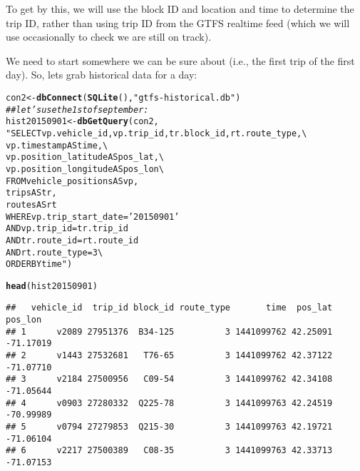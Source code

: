 \documentclass[10pt]{article}\usepackage[]{graphicx}\usepackage[]{color}
\makeatletter
\newcommand{\hlstr}[1]{\textcolor[rgb]{0.192,0.494,0.8}{#1}}%
\newcommand{\hlcom}[1]{\textcolor[rgb]{0.678,0.584,0.686}{\textit{#1}}}%
\newcommand{\hlstd}[1]{\textcolor[rgb]{0.345,0.345,0.345}{#1}}%
\newcommand{\hlkwb}[1]{\textcolor[rgb]{0.69,0.353,0.396}{#1}}%
\newcommand{\hlkwd}[1]{\textcolor[rgb]{0.737,0.353,0.396}{\textbf{#1}}}%
\newenvironment{kframe}{%
 \def\at@end@of@kframe{}%
 \ifinner\ifhmode%
  \def\at@end@of@kframe{\end{minipage}}%
  \begin{minipage}{\columnwidth}%
 \fi\fi%
 \def\FrameCommand##1{\hskip\@totalleftmargin \hskip-\fboxsep
 \colorbox{shadecolor}{##1}\hskip-\fboxsep
     \hskip-\linewidth \hskip-\@totalleftmargin \hskip\columnwidth}%
 \MakeFramed {\advance\hsize-\width
   \@totalleftmargin\z@ \linewidth\hsize
   \@setminipage}}%
 {\par\unskip\endMakeFramed%
 \at@end@of@kframe}
\newenvironment{knitrout}{}{} %
\makeatother
\begin{document}
To get by this, we will use the block ID and location and time to determine the trip ID,
rather than using trip ID from the GTFS realtime feed (which we will use occasionally to
check we are still on track).


We need to start somewhere we can be sure about (i.e., the first trip of the first day).
So, lets grab historical data for a day:
\begin{knitrout}
\color{fgcolor}\begin{kframe}
\begin{alltt}
\hlstd{con2} \hlkwb{<-} \hlkwd{dbConnect}\hlstd{(}\hlkwd{SQLite}\hlstd{(),} \hlstr{"gtfs-historical.db"}\hlstd{)}
\hlcom{## let's use the 1st of september:}
\hlstd{hist20150901} \hlkwb{<-} \hlkwd{dbGetQuery}\hlstd{(con2,}
                           \hlstr{"SELECT vp.vehicle_id, vp.trip_id, tr.block_id, rt.route_type, \textbackslash{}
                                   vp.timestamp AS time, \textbackslash{}
                                   vp.position_latitude AS pos_lat, \textbackslash{}
                                   vp.position_longitude AS pos_lon \textbackslash{}
                            FROM vehicle_positions AS vp, 
                                 trips             AS tr, 
                                 routes            AS rt
                            WHERE vp.trip_start_date = '20150901'
                              AND vp.trip_id    = tr.trip_id 
                              AND tr.route_id   = rt.route_id 
                              AND rt.route_type = 3 \textbackslash{}
                            ORDER BY time"}\hlstd{)}

\hlkwd{head}\hlstd{(hist20150901)}
\end{alltt}
\begin{verbatim}
##   vehicle_id  trip_id block_id route_type       time  pos_lat   pos_lon
## 1      v2089 27951376  B34-125          3 1441099762 42.25091 -71.17019
## 2      v1443 27532681   T76-65          3 1441099762 42.37122 -71.07710
## 3      v2184 27500956   C09-54          3 1441099762 42.34108 -71.05644
## 4      v0903 27280332  Q225-78          3 1441099763 42.24519 -70.99989
## 5      v0794 27279853  Q215-30          3 1441099763 42.19721 -71.06104
## 6      v2217 27500389   C08-35          3 1441099763 42.33713 -71.07153
\end{verbatim}
\end{kframe}
\end{knitrout}
\end{document}
